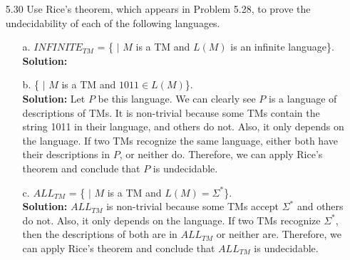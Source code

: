 \begin{enumerate}
\item[5.30]Use Rice's theorem, which appears in Problem 5.28, to prove the undecidability of each of the following languages.
\begin{enumerate}
\item[a.]$INFINITE_{TM}$ = \{ $|$ $M$ is a TM and $L(M)$ is an infinite language\}.
\\
\textbf{Solution:} \alreadyanswered
\item[b.]\{ $|$ $M$ is a TM and $1011 \in L(M)$\}.
\\
\textbf{Solution:} Let $P$ be this language. We can clearly see $P$ is a language of descriptions of TMs. It is non-trivial because some TMs contain the string 1011 in their language, and others do not. Also, it only depends on the language. If two TMs recognize the same language, either both have their descriptions in $P$, or neither do. Therefore, we can apply Rice's theorem and conclude that $P$ is undecidable.
\item[c.]$ALL_{TM}$ = \{ $|$ $M$ is a TM and $L(M) = \Sigma^*$\}.
\\
\textbf{Solution:} $ALL_{TM}$ is non-trivial because some TMs accept $\Sigma^*$ and others do not. Also, it only depends on the language. If two TMs recognize $\Sigma^*$, then the descriptions of both are in $ALL_{TM}$ or neither are. Therefore, we can apply Rice's theorem and conclude that $ALL_{TM}$ is undecidable.
\end{enumerate}

\end{enumerate}